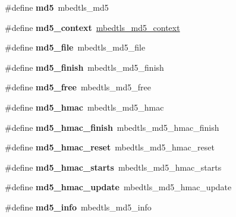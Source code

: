 \begin{DoxyCompactItemize}
\#define {\bfseries md5}~mbedtls\+\_\+md5
\item 
\mbox{\label{compat-1_83_8h_a325ed7545ed0e7ae3f0476b72524c2a0}} 
\#define {\bfseries md5\+\_\+context}~\mbox{\hyperlink{structmbedtls__md5__context}{mbedtls\+\_\+md5\+\_\+context}}
\item 
\mbox{\label{compat-1_83_8h_ab65d709bbc812ea34dd09e54113220f6}} 
\#define {\bfseries md5\+\_\+file}~mbedtls\+\_\+md5\+\_\+file
\item 
\mbox{\label{compat-1_83_8h_a85699062500549162c6947b40e77125a}} 
\#define {\bfseries md5\+\_\+finish}~mbedtls\+\_\+md5\+\_\+finish
\item 
\mbox{\label{compat-1_83_8h_a188152fce754e199968f54c0cee4d8fe}} 
\#define {\bfseries md5\+\_\+free}~mbedtls\+\_\+md5\+\_\+free
\item 
\mbox{\label{compat-1_83_8h_a5c29496772f93532003a7a8f3d8c0891}} 
\#define {\bfseries md5\+\_\+hmac}~mbedtls\+\_\+md5\+\_\+hmac
\item 
\mbox{\label{compat-1_83_8h_a79f052b92ae5978f7f76803c3aee7ee8}} 
\#define {\bfseries md5\+\_\+hmac\+\_\+finish}~mbedtls\+\_\+md5\+\_\+hmac\+\_\+finish
\item 
\mbox{\label{compat-1_83_8h_a78633938348a7d9437c87a7df89e1e01}} 
\#define {\bfseries md5\+\_\+hmac\+\_\+reset}~mbedtls\+\_\+md5\+\_\+hmac\+\_\+reset
\item 
\mbox{\label{compat-1_83_8h_afdbf29f300e58f10e7d3a7047bc2bf07}} 
\#define {\bfseries md5\+\_\+hmac\+\_\+starts}~mbedtls\+\_\+md5\+\_\+hmac\+\_\+starts
\item 
\mbox{\label{compat-1_83_8h_a0911aa806a9551912091b44f80602ac6}} 
\#define {\bfseries md5\+\_\+hmac\+\_\+update}~mbedtls\+\_\+md5\+\_\+hmac\+\_\+update
\item 
\mbox{\label{compat-1_83_8h_a0d22143bad997b2989ab352597dbce8f}} 
\#define {\bfseries md5\+\_\+info}~mbedtls\+\_\+md5\+\_\+info
\item 

\end{DoxyCompactItemize}
